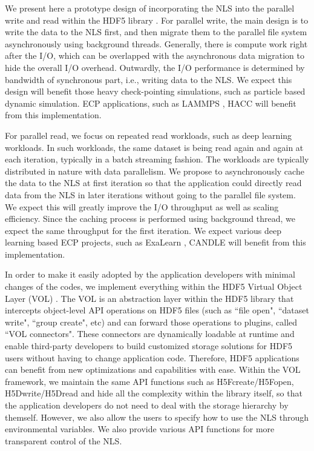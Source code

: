 \documentclass[aps, prb, 11pt, notitlepage]{revtex4-1}
\begin{document}
We present here a prototype design of incorporating the NLS into the parallel write and read within the HDF5 library \cite{hdf5}. For parallel write, the main design is to write the data to the NLS first, and then migrate them to the parallel file system asynchronously using background threads. Generally, there is compute work right after the I/O, which can be overlapped with the asynchronous data migration to hide the overall I/O overhead. Outwardly, the I/O performance is determined by bandwidth of synchronous part, i.e., writing data to the NLS. We expect this design will benefit those heavy check-pointing simulations, such as particle based dynamic simulation. ECP applications, such as LAMMPS \cite{lammps}, HACC \cite{hacc} will benefit from this implementation. 

For parallel read, we focus on repeated read workloads, such as deep learning workloads. In such workloads, the same dataset is being read again and again at each iteration, typically in a batch streaming fashion. The workloads are typically distributed in nature with data parallelism. We propose to asynchronously cache the data to the NLS at first iteration so that the application could directly read data from the NLS in later iterations without going to the parallel file system. We expect this will greatly improve the I/O throughput as well as scaling efficiency. Since the caching process is performed using background thread, we expect the same throughput for the first iteration. We expect various deep learning based ECP projects, such as ExaLearn \cite{exalearn}, CANDLE \cite{candle} will benefit from this implementation.

In order to make it easily adopted by the application developers with minimal changes of the codes, we implement everything within the HDF5 Virtual Object Layer (VOL) \cite{vol}. The VOL is an abstraction layer within the HDF5 library that intercepts object-level API operations on HDF5 files (such as ``file open", ``dataset write", ``group create", etc) and can forward those operations to plugins, called ``VOL connectors". These connectors are dynamically loadable at runtime and enable third-party developers to build customized storage solutions for HDF5 users without having to change application code. Therefore, HDF5 applications can benefit from new optimizations and capabilities with ease. Within the VOL framework, we maintain the same API functions such as H5Fcreate/H5Fopen, H5Dwrite/H5Dread and hide all the complexity within the library itself, so that the application developers do not need to deal with the storage hierarchy by themself. However, we also allow the users to specify how to use the NLS through environmental variables. We also provide various API functions for more transparent control of the NLS. 
\end{document}
